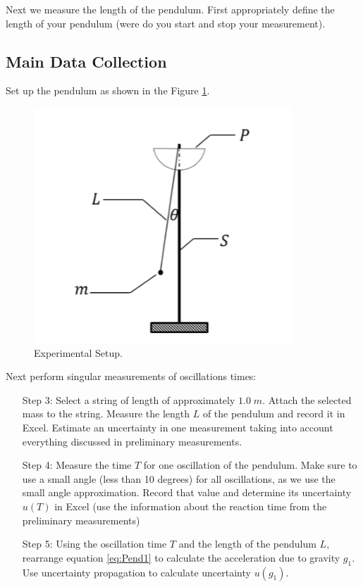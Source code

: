 Next we measure the length of the pendulum. First appropriately define the length of your pendulum (were do you start and stop your measurement).

\subsection{Main Data Collection}

Set up the pendulum as shown in the Figure \ref{fig:Pend1}.

\begin{figure}[H]
    \centering
    \includegraphics[scale = 0.8]{Images/Pend1.PNG}
    \caption{Experimental Setup.}
    \label{fig:Pend1}
\end{figure}

Next perform singular measurements of oscillations times:


\begin{itemize}[leftmargin = 50pt]
    \item[Step 3:] Select a string of length of approximately $1.0\;m$. Attach the selected mass to the string. Measure the length $L$ of the pendulum and record it in Excel. Estimate an uncertainty in one measurement taking into account everything discussed in preliminary measurements.
    \item[Step 4:] Measure the time $T$ for one oscillation of the pendulum. Make sure to use a small angle (less than 10 degrees) for all oscillations, as we use the small angle approximation. Record that value and determine its uncertainty $u(T)$ in Excel (use the information about the reaction time from the preliminary measurements)
    \item[Step 5:] Using the oscillation time $T$ and the length of the pendulum $L$, rearrange equation \ref{eq:Pend1} to calculate the acceleration due to gravity $g_1$. Use uncertainty propagation to calculate uncertainty $u(g_1)$.
\end{itemize}


